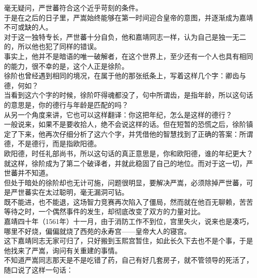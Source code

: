 \begin{multicols}{\theparacolNo}
毫无疑问，严世蕃符合这个近乎苛刻的条件。\\

于是在之后的日子里，严嵩始终能够在第一时间迎合皇帝的意图，并逐渐成为嘉靖不可或缺的人。\\

对于这一独特专长，严世蕃十分自负，他和嘉靖同志一样，认为自己是独一无二的，所以他也犯了同样的错误。\\

事实上，他并不是暗语的唯一破解者，在这个世界上，至少还有一个人也具有相同的能力，很不幸的是，这个人正是徐阶。\\

徐阶也曾经遇到相同的境况，在属于他的那张纸条上，写着这样几个字：卿齿与德，何如？\\

当看到这六个字的时候，徐阶吓得魂都没了，句中所谓齿，是指年龄，所以这句话的意思是，你的德行与年龄是匹配的吗？\\

从另一个角度来讲，它也可以这样翻译：你这把年纪，怎么是这样的德行？\\

一般说来，如果不是要收拾人，绝不会说这样的话。但在短暂的恐慌之后，徐阶镇定了下来，他再次仔细分析了这六个字，并凭借他的智慧找到了正确的答案：所谓德，不是德行，而是指欧阳德。\\

欧阳德，时任礼部尚书，所以这句话的真正意思是，你和欧阳德，谁的年纪更大？\\

就这样，徐阶成为了第二个破译者，并就此稳固了自己的地位。而对于这一切，严世蕃并不知道。\\

但处于暗处的徐阶却也无计可施，问题很明显，要解决严嵩，必须除掉严世蕃，可是严世蕃实在太过聪明，毫无漏洞可钻。\\

既不能进，也不能退，这场智力竞赛再次陷入了僵局，然而就在他百无聊赖，苦苦等待之时，一个偶然事件的发生，却彻底改变了双方的力量对比。\\

嘉靖四十年（1561年）十一月，由于消防工作不到位，宫里失火，说来也是凑巧，哪里不好烧，偏偏就烧了西苑的永寿宫——皇帝大人的寝宫。\\

这下嘉靖同志无家可归了，只好搬到玉熙宫暂住，如此长久下去也不是个事，于是他找来了严嵩，询问有关重建的事情。\\

不知道严嵩同志那天是不是吃错了药，自己有好几套房子，就不管领导的死活了，随口说了这样一句话：\\


\end{multicols}
